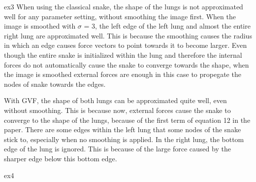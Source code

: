 ex3
When using the classical snake, the shape of the lungs is not approximated well for any parameter setting, without smoothing the image first. When the image is smoothed with $\sigma$ = 3, the left edge of the left lung and almost the entire right lung are approximated well. This is because the smoothing causes the radius in which an edge causes force vectors to point towards it to become larger. Even though the entire snake is initialized within the lung and therefore the internal forces do not automatically cause the snake to converge towards the shape, when the image is smoothed external forces are enough in this case to propegate the nodes of snake towards the edges.

With GVF, the shape of both lungs can be approximated quite well, even without smoothing. This is because now, external forces cause the snake to converge to the shape of the lungs, because of the first term of equation 12 in the paper. There are some edges within the left lung that some nodes of the snake stick to, especially when no smoothing is applied. In the right lung, the bottom edge of the lung is ignored. This is because of the large force caused by the sharper edge below this bottom edge.


ex4
